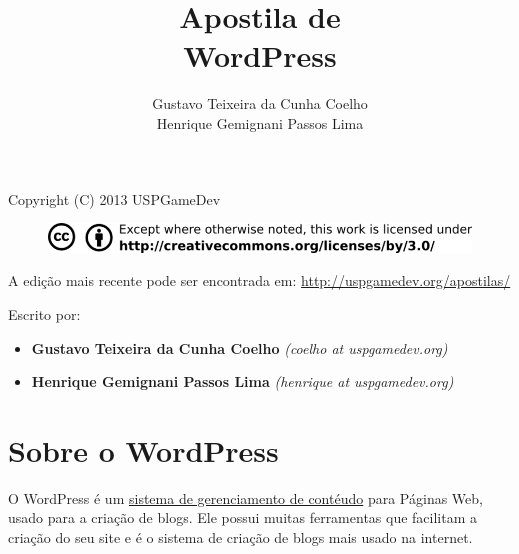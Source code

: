 \documentclass[12pt,onecolumn]{article}
\begin{document}
\begin{titlepage}

	\title{
		\bf
		\LARGE Apostila de  \\
		\Huge  WordPress
	}

	\author{Gustavo Teixeira da Cunha Coelho \\ Henrique Gemignani Passos Lima}

	\maketitle

	\thispagestyle{empty}

	\vfill
	

\end{titlepage}

	\thispagestyle{empty}

\begin{center}
  Copyright (C) 2013 USPGameDev
\end{center}
\begin{figure}[ht]
  \centering
  \includegraphics[width=\textwidth]{../CC-BY.png}
\end{figure}

\vfill

\begin{center}
A edição mais recente pode ser encontrada em:
\url{http://uspgamedev.org/apostilas/}
\end{center}

\vfill

Escrito por:
\begin{itemize}
  \item \textbf{Gustavo Teixeira da Cunha Coelho} \textit{(coelho at uspgamedev.org)}
  \item \textbf{Henrique Gemignani Passos Lima} \textit{(henrique at uspgamedev.org)}
\end{itemize}

\clearpage

\tableofcontents

\clearpage

\section{Sobre o WordPress}
	O WordPress é um \href{http://pt.wikipedia.org/wiki/Sistema_de_gerenciamento_de_conte%C3%BAdo}{
	sistema de gerenciamento de contéudo} para Páginas Web, usado para a criação de blogs. Ele possui muitas 
	ferramentas que facilitam a criação do seu site e é o sistema de criação de blogs mais usado na internet.
\end{document}

